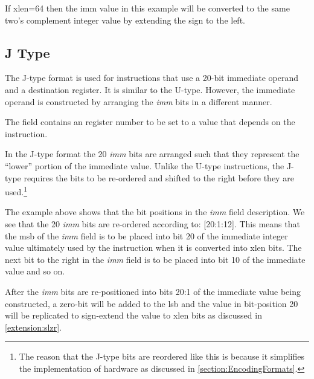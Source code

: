 
If \Gls{xlen}=64 then the imm value in this example will be converted to the
same two's complement integer value by extending the sign to the left.


\subsection{J Type}
\label{insnformat:jtype}

The J-type format is used for instructions that use a 20-bit immediate operand
and a destination register.  It is similar to the U-type.  However, the immediate
operand is constructed by arranging the {\em imm} bits in a different manner.


The  field contains an  register number to be set to a value that
depends on the instruction.


In the J-type format the 20 {\em imm} bits are arranged such 
that they represent the ``lower'' portion of the immediate value.  Unlike 
the U-type 
instructions, the J-type requires the bits to be re-ordered and shifted 
to the right before they are used.\footnote{The reason that the J-type 
bits are reordered like this is because it simplifies the implementation of 
hardware as discussed in \autoref{section:EncodingFormats}.}

The example above shows that the bit positions in the {\em imm} field 
description.  We see that the 20 {\em imm} bits are re-ordered according to: 
[20:1:12].  
This means that the \acrshort{msb} of the {\em imm} field is to be placed 
into bit 20 of the immediate integer value ultimately used by the instruction 
when it is converted into \Gls{xlen} bits.  
The next bit to the right in the {\em imm} field is to be placed into bit 10 of 
the immediate value and so on.

After the {\em imm} bits are re-positioned into bits 20:1 of the immediate value
being constructed, a zero-bit will be added to the \acrshort{lsb} 
and the value in bit-position 20 will be replicated to sign-extend the 
value to \Gls{xlen} bits as discussed in \autoref{extension:slzr}.


